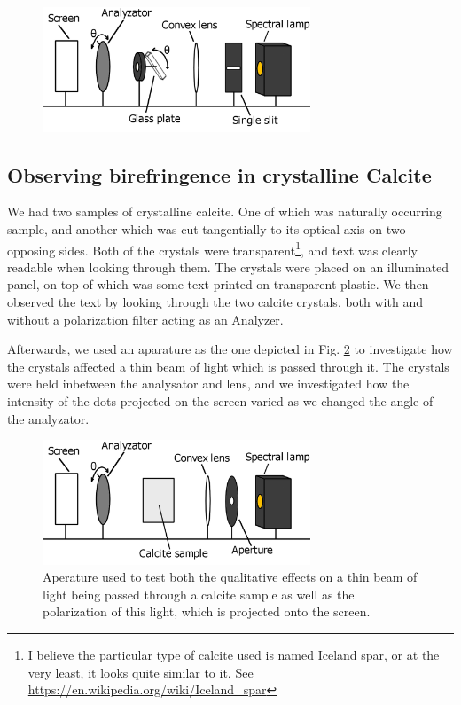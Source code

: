 \documentclass[11pt,a4paper]{article}
\begin{document}
    \begin{figure}[H]
      \center
      \includegraphics[width=8cm]{scripts/figs/diagram_4.png}
      \caption{}
      \label{fig:glassplate}
    \end{figure}

  \subsection{Observing birefringence in crystalline Calcite}
    We had two samples of crystalline calcite. One of which was naturally occurring sample, and another which was cut tangentially to its optical axis on two opposing sides. Both of the crystals were transparent\footnote{I believe the particular type of calcite used is named Iceland spar, or at the very least, it looks quite similar to it. See \url{https://en.wikipedia.org/wiki/Iceland_spar}}, and text was clearly readable when looking through them. The crystals were placed on an illuminated panel, on top of which was some text printed on transparent plastic. We then observed the text by looking through the two calcite crystals, both with and without a polarization filter acting as an Analyzer. 

    Afterwards, we used an aparature as the one depicted in Fig. \ref{fig:calcite} to investigate how the crystals affected a thin beam of light which is passed through it. The crystals were held inbetween the analysator and lens, and we investigated how the intensity of the dots projected on the screen varied as we changed the angle of the analyzator.

    \begin{figure}[H]
      \center
      \includegraphics[width=8cm]{scripts/figs/diagram_5.png}
      \caption{Aperature used to test both the qualitative effects on a thin beam of light being passed through a calcite sample as well as the polarization of this light, which is projected onto the screen.}
      \label{fig:calcite}
    \end{figure}
\end{document}
